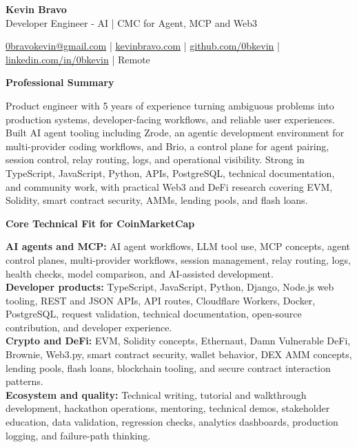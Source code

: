 \documentclass[10pt]{article}
\newcommand{\sectiontitle}[1]{%
    \vspace{3pt}
    \begin{center}
        \textbf{#1}
    \end{center}
    \vspace{-5pt}
}
\begin{document}
\raggedright

\begin{center}
    {\LARGE \textbf{Kevin Bravo}}\\
    Developer Engineer - AI | CMC for Agent, MCP and Web3 \\
    \hrulefill
\end{center}

\begin{center}
    \href{mailto:0bravokevin@gmail.com}{0bravokevin@gmail.com}
    | \href{https://kevinbravo.com}{kevinbravo.com}
    | \href{https://github.com/0bkevin}{github.com/0bkevin}
    | \href{https://www.linkedin.com/in/0bkevin/}{linkedin.com/in/0bkevin}
    | Remote
\end{center}

\fontsize{9.65}{10.65}\selectfont

\sectiontitle{Professional Summary}
Product engineer with 5 years of experience turning ambiguous problems into production systems, developer-facing workflows, and reliable user experiences. Built AI agent tooling including Zrode, an agentic development environment for multi-provider coding workflows, and Brio, a control plane for agent pairing, session control, relay routing, logs, and operational visibility. Strong in TypeScript, JavaScript, Python, APIs, PostgreSQL, technical documentation, and community work, with practical Web3 and DeFi research covering EVM, Solidity, smart contract security, AMMs, lending pools, and flash loans.

\sectiontitle{Core Technical Fit for CoinMarketCap}
\textbf{AI agents and MCP:} AI agent workflows, LLM tool use, MCP concepts, agent control planes, multi-provider workflows, session management, relay routing, logs, health checks, model comparison, and AI-assisted development. \\
\textbf{Developer products:} TypeScript, JavaScript, Python, Django, Node.js web tooling, REST and JSON APIs, API routes, Cloudflare Workers, Docker, PostgreSQL, request validation, technical documentation, open-source contribution, and developer experience. \\
\textbf{Crypto and DeFi:} EVM, Solidity concepts, Ethernaut, Damn Vulnerable DeFi, Brownie, Web3.py, smart contract security, wallet behavior, DEX AMM concepts, lending pools, flash loans, blockchain tooling, and secure contract interaction patterns. \\
\textbf{Ecosystem and quality:} Technical writing, tutorial and walkthrough development, hackathon operations, mentoring, technical demos, stakeholder education, data validation, regression checks, analytics dashboards, production logging, and failure-path thinking.
\end{document}
